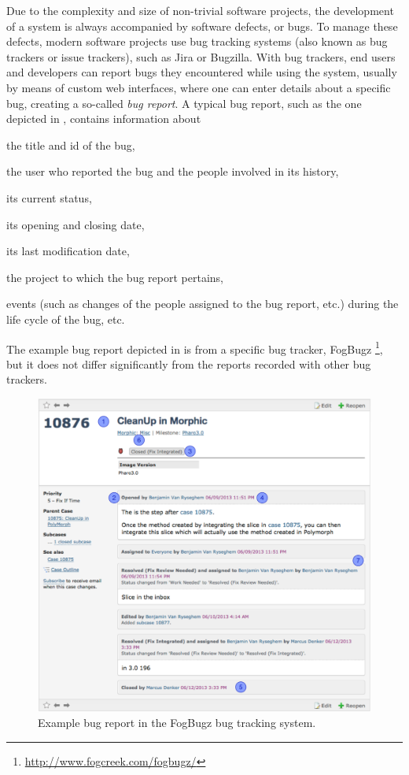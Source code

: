 Due to the complexity and size of non-trivial software projects, the development of a system is always accompanied by software defects, or bugs.
To manage these defects, modern software projects use bug tracking systems (also known as bug trackers or issue trackers), such as Jira or Bugzilla.
With bug trackers, end users and developers can report bugs they encountered while using the system, usually by means of custom web interfaces, where one can enter details about a specific bug, creating a so-called \emph{bug report}.
A typical bug report, such as the one depicted in , contains information about \begin{inparaenum}[(1)] \item the title and id of the bug, \item the user who reported the bug and the people involved in its history, \item its current status, \item its opening and closing date, \item its last modification date, \item the project to which the bug report pertains, \item events (such as changes of the people assigned to the bug report, etc.) during the life cycle of the bug, etc. \end{inparaenum}
The example bug report depicted in  is from a specific bug tracker, FogBugz \footnote{\url{http://www.fogcreek.com/fogbugz/}}, but it does not differ significantly from the reports recorded with other bug trackers.

\begin{figure}[ht]
\centering
\includegraphics[width=.95\linewidth,trim=0 300 0 0,clip=true]{Images/visualize/fogbugz-screen}
\caption{Example bug report in the FogBugz bug tracking system.}
\label{fig:fogbugz-example}
\end{figure}

